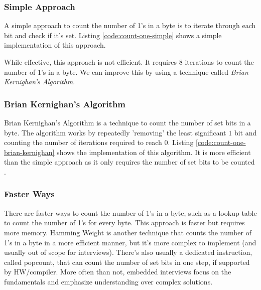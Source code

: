 \documentclass[main.tex]{subfiles}
\begin{document}
\subsubsection{Simple Approach}
A simple approach to count the number of 1's in a byte is to iterate through each bit and check if it's set. Listing \ref{code:count-one-simple} shows a simple implementation of this approach.



\noindent While effective, this approach is not efficient. It requires 8 iterations to count the number of 1's in a byte. We can improve this by using a technique called \textit{Brian Kernighan's Algorithm}.

\subsubsection{Brian Kernighan's Algorithm}
Brian Kernighan's Algorithm is a technique to count the number of set bits in a byte. The algorithm works by repeatedly 'removing' the least significant $1$ bit and counting the number of iterations required to reach 0. Listing \ref{code:count-one-brian-kernighan} shows the implementation of this algorithm. It is more efficient than the simple approach as it only requires the number of set bits to be counted \cite{seander_bithacks}.



\subsubsection{Faster Ways}
There are faster ways to count the number of 1's in a byte, such as a lookup table to count the number of 1's for every byte. This approach is faster but requires more memory. Hamming Weight is another technique that counts the number of 1's in a byte in a more efficient manner, but it's more complex to implement (and usually out of scope for interviews). There's also usually a dedicated instruction, called popcount, that can count the number of set bits in one step, if supported by HW/compiler. More often than not, embedded interviews focus on the fundamentals and emphasize understanding over complex solutions.
\end{document}
